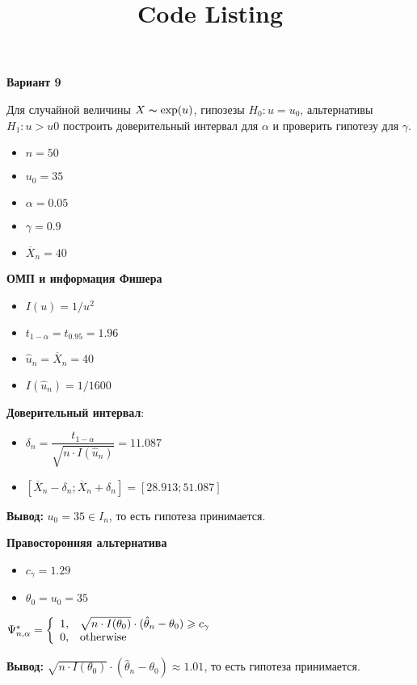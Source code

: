 \documentclass{article}
\title{Code Listing}
\begin{document}
	{\bf Вариант 9}
	
	Для случайной величины $X\thicksim\exp(u)$, гипозезы $H_0\colon u=u_0$, альтернативы $H_1\colon u>u0$ построить доверительный интервал для $\alpha$ и проверить гипотезу для $\gamma$.
	
	\begin{itemize}
		\item $n=50$
		\item $u_0=35$
		\item $\alpha=0.05$
		\item $\gamma=0.9$
		\item $\overline{X}_n=40$
	\end{itemize}
	
	\bigskip
	
	{\bf ОМП и информация Фишера}
	\begin{itemize}
		\item $I(u)=1/u^2$
		\item $t_{1-\alpha}=t_{0.95}=1.96$
		\item $\hat{u}_n=\overline{X}_n=40$
		\item $I(\hat{u}_n)=1/1600$
	\end{itemize}

\bigskip

	\textbf{Доверительный интервал}:
	\begin{itemize}
		\item $\delta_n=\dfrac{t_{1-\alpha}}{\sqrt{n\cdot I(\hat{u}_n)}}=11.087$
		\item $\left[\overline{X}_n-\delta_n;\overline{X}_n+\delta_n\right]=[28.913;51.087]$
	\end{itemize}

	{\bf  Вывод:}
	$u_0=35\in I_n$, то есть гипотеза принимается.
	
	\bigskip
	
	\textbf{Правосторонняя альтернатива}
	\begin{itemize}
		\item $c_\gamma=1.29$
		\item $\theta_0=u_0=35$
	\end{itemize}

	$\Psi_{n,\alpha}^{*}=
	\left\{\begin{array}{l l}
	1, & \sqrt{n\cdot I(\theta_0)}\cdot(\hat{\theta}_n-\theta_0)\geqslant c_\gamma\\
	0, & \text{otherwise}
	\end{array}\right. $
	
	{\bf  Вывод:} $\sqrt{n\cdot I(\theta_0)}\cdot(\hat{\theta}_n-\theta_0)\approx1.01$, то есть гипотеза принимается.
	
	
\end{document}
